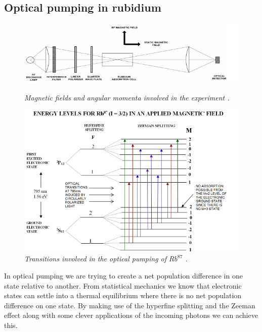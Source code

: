 \documentclass[twocolumn]{article}
\begin{document}
\subsection{Optical pumping in rubidium}
\begin{figure}
\begin{minipage}[t]{\textwidth}
\includegraphics[width=\linewidth]{pictures/rough-apparatus.png}
\caption{\textit{Magnetic fields and angular momenta involved in the experiment
\cite{ref:3}.}}
\label{fig:9}
\end{minipage}
\vfill
\begin{minipage}[t]{\textwidth}
\includegraphics[width=\linewidth]{pictures/energy-lev-trans.png}
\caption{\textit{Transitions involved in the optical pumping of $Rb^{87}$ 
\cite{ref:3}.}}
\label{fig:10}
\end{minipage}
\end{figure}
In optical pumping we are trying to create a net population 
difference in one state relative to another. From statistical mechanics we know 
that electronic states can settle into a thermal equilibrium where there is no 
net population difference on one state. By making use of the hyperfine 
splitting and the Zeeman effect along with some clever applications of the 
incoming photons we can achieve this.
\\
\end{document}

